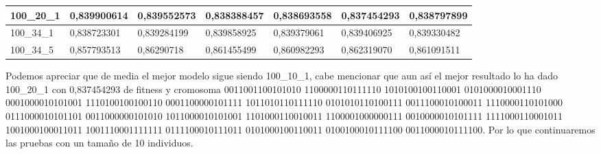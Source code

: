 \documentclass[12pt, spanish, pdftex]{UC3M_document}
\begin{document}
\begin{table}[H]
{\begin{tabular}{|l|l|l|l|l|l|l|}
			100\_20\_1                                                                           & \cellcolor[HTML]{F8696B}0,839900614                                            & \cellcolor[HTML]{FB8F73}0,839552573                                            & \cellcolor[HTML]{D8DF81}0,838388457                                            & \cellcolor[HTML]{FFEB84}0,838693558                                            & \cellcolor[HTML]{63BE7B}0,837454293                                            & \cellcolor[HTML]{8AC97D}0,838797899                                                \\ \hline
			100\_34\_1                                                                           & \cellcolor[HTML]{63BE7B}0,838723301                                            & \cellcolor[HTML]{E8E482}0,839284199                                            & \cellcolor[HTML]{F8696B}0,839858925                                            & \cellcolor[HTML]{FFEB84}0,839379061                                            & \cellcolor[HTML]{FFE483}0,839406925                                            & \cellcolor[HTML]{FFE082}0,839330482                                                \\ \hline
			100\_34\_5                                                                           & \cellcolor[HTML]{63BE7B}0,857793513                                            & \cellcolor[HTML]{F8696B}0,86290718                                             & \cellcolor[HTML]{FFEB84}0,861455499                                            & \cellcolor[HTML]{EAE582}0,860982293                                            & \cellcolor[HTML]{FB9E76}0,862319070                                            & \cellcolor[HTML]{FB9173}0,861091511                                                \\ \hline
		\end{tabular}%
	}
\end{table}

Podemos apreciar que de media el mejor modelo sigue siendo 100\_10\_1, cabe mencionar que aun así el mejor resultado lo ha dado 100\_20\_1 con 0,837454293 de fitness y cromosoma 0011001100101010 1100000110111110 1010100100110001 0101000010001110 0001000010101001 1110100100100110 0001100000101111 1011010110111110 0101010110100111 0011100010100011 1110000110101000 0111000010101101 0011000000101010 1011000010101001 1101000110010011 1100001000000111 0010000010101111 1111000110001011 1001000100011011 1001110001111111 0111100010111011 0101000100110011 0100100010111100 0011000010111100. Por lo que continuaremos las pruebas con un tamaño de 10 individuos.
\end{document}
